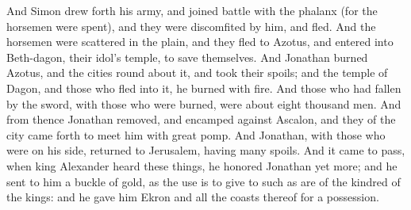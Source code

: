 {And Simon drew forth his army, and joined battle with the phalanx (for the horsemen were spent), and they were discomfited by him, and fled.
And the horsemen were scattered in the plain, and they fled to Azotus, and entered into Beth-dagon, their idol’s temple, to save themselves.
And Jonathan burned Azotus, and the cities round about it, and took their spoils; and the temple of Dagon, and those who fled into it, he burned with fire.
And those who had fallen by the sword, with those who were burned, were about eight thousand men.
And from thence Jonathan removed, and encamped against Ascalon, and they of the city came forth to meet him with great pomp.
And Jonathan, with those who were on his side, returned to Jerusalem, having many spoils.
And it came to pass, when king Alexander heard these things, he honored Jonathan yet more;
and he sent to him a buckle of gold, as the use is to give to such as are of the kindred of the kings: and he gave him Ekron and all the coasts thereof for a possession.

}
